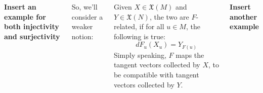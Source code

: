 \documentclass[20pt,,margin=1in,innermargin=-4.5in,blockverticalspace=-0.25in]{tikzposter}
\begin{document}
\begin{columns}
{        \textbf{Insert an example for both injectivity and surjectivity}

        So, we'll consider a weaker notion: 
        \begin{definitionBox}
            Given $X\in\mathfrak{X}(M)$ and $Y\in\mathfrak{X}(N)$, the two are $F$-related, if for all $u\in M$, the following is true:
            $$dF_u(X_u) = Y_{F(u)}$$
            Simply speaking, $F$ maps the tangent vectors collected by $X$, to be compatible with tangent vectors collected by $Y$.
        \end{definitionBox}

        \textbf{Insert another example}

    }



\end{columns}
\end{document}
